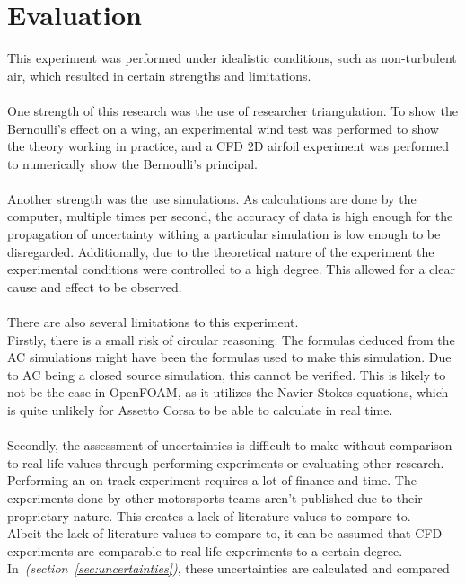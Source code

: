 \documentclass[11pt, a4paper]{article}
\begin{document}
\section{Evaluation}
This experiment was performed under idealistic conditions, such as non-turbulent air, which resulted in certain strengths and limitations.
\\\\
One strength of this research was the use of researcher triangulation. 
To show the Bernoulli's effect on a wing, an experimental wind test was performed to show the theory working in practice, 
and a CFD 2D airfoil experiment was performed to numerically show the Bernoulli's principal.
\\\\
Another strength was the use simulations. 
As calculations are done by the computer, multiple times per second, the accuracy of data is high enough for the propagation of uncertainty withing a particular simulation is low enough to be disregarded.
Additionally, due to the theoretical nature of the experiment the experimental conditions were controlled to a high degree. This allowed for a clear cause and effect to be observed.
\\\\
There are also several limitations to this experiment.
\\
Firstly, there is a small risk of circular reasoning. The formulas deduced from the AC simulations might have been the formulas used to make this simulation. Due to AC being a closed source simulation, this cannot be verified.
This is likely to not be the case in OpenFOAM, as it utilizes the Navier-Stokes equations, which is quite unlikely for Assetto Corsa to be able to calculate in real time.
\\\\
Secondly, the assessment of uncertainties is difficult to make without comparison to real life values through performing experiments or evaluating other research. Performing an on track experiment requires a lot of finance and time.
The experiments done by other motorsports teams aren't published due to their proprietary nature. This creates a lack of literature values to compare to.
\\
Albeit the lack of literature values to compare to, it can be assumed that CFD experiments are comparable to real life experiments to a certain degree. In~\textit{(section~\ref{sec:uncertainties})}, these uncertainties are calculated and compared
\end{document}
